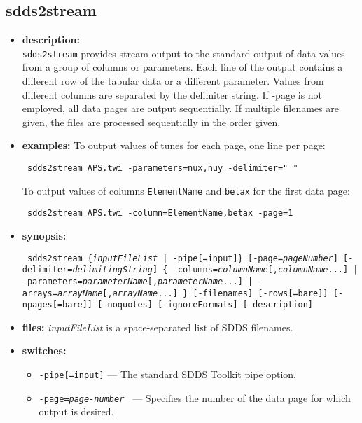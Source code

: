 \newpage 
\subsection{sdds2stream} 
\label{sdds2stream} 
 
\begin{itemize} 
\item {\bf description:} \hspace*{1mm}\\ 
{\tt sdds2stream} provides stream output to the standard output of data values from a group of columns or parameters.  
Each line of the output contains a different row of the tabular data or a different parameter.   
Values from different columns are separated by the delimiter string. 
If -page is not employed, all data pages are output sequentially.  
If multiple filenames are given, the files are processed sequentially in the order given. 
\item {\bf examples:} 
To output values of tunes for each page, one line per page: 
\begin{flushleft}{\tt 
sdds2stream APS.twi -parameters=nux,nuy -delimiter=" " 
}\end{flushleft} 
To output values of columns {\tt ElementName} and {\tt betax} for the first data page: 
\begin{flushleft}{\tt 
sdds2stream APS.twi -column=ElementName,betax -page=1 
}\end{flushleft} 
\item {\bf synopsis:}  
\begin{flushleft}{\tt 
sdds2stream \{{\em inputFileList} | -pipe[=input]\} 
[-page={\em pageNumber}] [-delimiter={\em delimitingString}]  
\{ -columns={\em columnName}[,{\em columnName}...] 
| -parameters={\em parameterName}[,{\em parameterName}...] 
| -arrays={\em arrayName}[,{\em arrayName}...] \} 
[-filenames] [-rows[=bare]] [-npages[=bare]] [-noquotes] [-ignoreFormats] [-description]
}\end{flushleft} 
\item {\bf files:} 
{\em inputFileList} is a space-separated list of SDDS filenames.   
\item {\bf switches:} 
    \begin{itemize} 
    \item {\tt -pipe[=input]} --- The standard SDDS Toolkit pipe option. 
    \item {\tt -page={\em page-number} } --- Specifies the number of the data page for which output is desired.   

\end{itemize}
\end{itemize}
